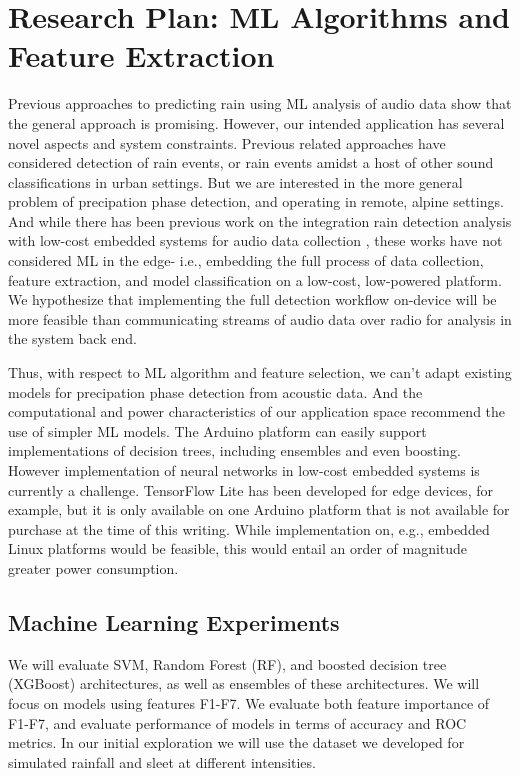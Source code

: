 \section{Research Plan: ML Algorithms and Feature Extraction}

Previous approaches to predicting rain using ML analysis of audio data
show that the general approach is promising. However, our intended
application has several novel aspects and system constraints. Previous
related approaches have considered detection of rain events, or rain
events amidst a host of other sound classifications in urban settings.
But we are interested in the more general problem of precipation phase
detection, and operating in remote, alpine settings. And while there
has been previous work on the integration rain detection analysis with
low-cost embedded systems for audio data collection
\cite{Avanzato_Fransesco_et_al.,Guico_et_al.}, these works have not
considered ML in the edge- i.e., embedding the full process of data
collection, feature extraction, and model classification on a low-cost,
low-powered platform. We hypothesize that implementing the
full detection workflow on-device will
be more feasible than communicating streams of audio data
over radio for analysis in the system back end.

Thus, with respect to ML algorithm and feature selection, we can't adapt
existing models for precipation phase detection
from acoustic data. And the computational and power characteristics of our
application space recommend the use of simpler ML models. The Arduino
platform can easily support implementations of decision trees,
including ensembles and even boosting. However implementation of
neural networks in low-cost embedded systems is currently a
challenge. TensorFlow Lite has been developed for edge devices, for
example, but it is only available on one Arduino platform that is not
available for purchase at the time of this writing. While
implementation on, e.g., embedded Linux platforms would be feasible,
this would entail an order of magnitude greater power consumption.

\subsection{Machine Learning Experiments}

We will evaluate SVM, Random Forest (RF), and boosted decision tree
(XGBoost) architectures, as well as ensembles of these architectures.
We will focus on models using features F1-F7. We evaluate both feature
importance of F1-F7, and evaluate performance of models in terms of
accuracy and ROC metrics. In our initial exploration we will use
the dataset we developed for simulated rainfall and sleet at different
intensities.
